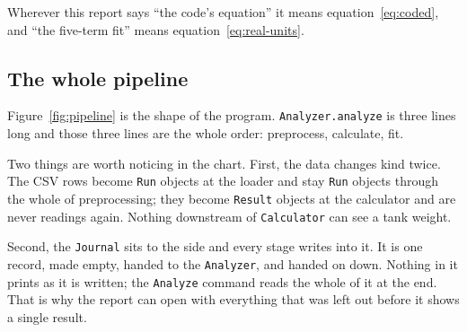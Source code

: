 Wherever this report says ``the code's equation'' it means equation~\ref{eq:coded}, and
``the five-term fit'' means equation~\ref{eq:real-units}.

\subsection{The whole pipeline}

Figure~\ref{fig:pipeline} is the shape of the program. \texttt{Analyzer.analyze} is three
lines long and those three lines are the whole order: preprocess, calculate, fit.

Two things are worth noticing in the chart. First, the data changes kind twice. The CSV rows
become \texttt{Run} objects at the loader and stay \texttt{Run} objects through the whole of
preprocessing; they become \texttt{Result} objects at the calculator and are never readings
again. Nothing downstream of \texttt{Calculator} can see a tank weight.

Second, the \texttt{Journal} sits to the side and every stage writes into it. It is one
record, made empty, handed to the \texttt{Analyzer}, and handed on down. Nothing in it
prints as it is written; the \texttt{Analyze} command reads the whole of it at the end. That
is why the report can open with everything that was left out before it shows a single result.

